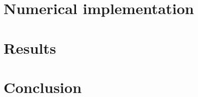 \documentclass[a4paper]{book}
\begin{document}
\chapter{Numerical implementation}

\chapter{Results}


\backmatter%
\chapter{Conclusion}

\printbibliography%
\end{document}
